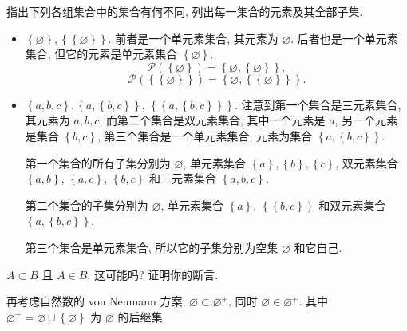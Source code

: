 \documentclass[10pt,UTF8]{book} %
\begin{document}
\begin{exercise}
    指出下列各组集合中的集合有何不同, 列出每一集合的元素及其全部子集.
    \begin{itemize}[itemsep=0pt]
        \item $\left\{ \varnothing \right\}, \left\{ 
            \left\{ \varnothing \right\}
        \right\}$. 前者是一个单元素集合, 其元素为 $\varnothing$.
        后者也是一个单元素集合, 但它的元素是单元素集合 $\left\{
            \varnothing
        \right\}$.
        \[ \mathcal{P}(\left\{\varnothing\right\})
        = \left\{ \varnothing, \left\{ \varnothing \right\} \right\}, \]
        \[ \mathcal{P} (\left\{\left\{\varnothing\right\}\right\})
        = \left\{
            \varnothing, \left\{\left\{\varnothing\right\}\right\}
        \right\}. \]
        \item $\left\{ a,b,c \right\}, \left\{ a, \left\{
            b,c
        \right\} \right\}$,
        $\left\{ \left\{
            a, \left\{
                b,c
            \right\}
        \right\} \right\}$. 注意到第一个集合是三元素集合, 
        其元素为 $a,b,c$,
        而第二个集合是双元素集合, 其中一个元素是 $a$, 另一个元素是集合 $\left\{
            b,c
        \right\}$,
        第三个集合是一个单元素集合, 元素为集合 $\left\{ a, \left\{b,c\right\} \right\}$.
        
        第一个集合的所有子集分别为
        $\varnothing$, 单元素集合 $\left\{a\right\},
        \left\{b\right\}, \left\{c\right\}$,
        双元素集合 $\left\{a,b\right\}$, $\left\{a,c\right\}$,
        $\left\{b,c\right\}$ 和三元素集合 $\left\{a,b,c\right\}$.
        
        第二个集合的子集分别为 $\varnothing$,
        单元素集合 $\left\{a\right\}$, $\left\{\left\{
            b,c 
        \right\} \right\}$
        和双元素集合 $\left\{ a, \left\{ b,c \right\} \right\}$.

        第三个集合是单元素集合, 所以它的子集分别为空集 $\varnothing$ 和它自己.
    \end{itemize}
\end{exercise}

\begin{exercise}
    $A \subset B$ 且 $A \in B$, 这可能吗? 证明你的断言.
    \begin{cmt}
        再考虑自然数的 von Neumann 方案,
        $\varnothing \subset \varnothing^+$,
        同时 $\varnothing \in \varnothing^+$.
        其中 $\varnothing^+ = \varnothing \cup \left\{ \varnothing \right\}$
        为 $\varnothing$ 的后继集.
    \end{cmt} 
\end{exercise}
\end{document}
